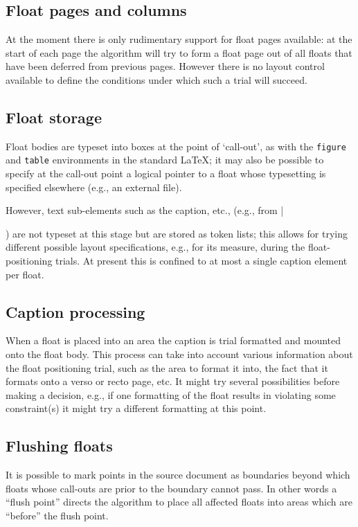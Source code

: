 \documentclass[twocolumn]{article}
\begin{document}
\subsection{Float pages and columns}

At the moment there is only rudimentary support for float pages
available: at the start of each page the algorithm will try to form a
float page out of all floats that have been deferred from previous
pages. However there is no layout control available to define the
conditions under which such a trial will succeed.


\subsection{Float storage}

Float bodies are typeset into boxes at the point of `call-out', as
with the \texttt{figure} and \texttt{table} environments in the standard
\LaTeX; it may also be possible to specify at the call-out point a
logical pointer to a float whose typesetting is specified elsewhere
(e.g., an external file).

However, text sub-elements such as the caption, etc., (e.g., from
|\caption|) are not typeset at this stage but are stored as token
lists; this allows for trying different possible layout specifications,
e.g., for its measure, during the float-positioning trials.  At present
this is confined to at most a single caption element per float.

\subsection{Caption processing}

When a float is placed into an area the caption is trial formatted and
mounted onto the float body. This process can take into account
various information about the float positioning trial, such as the
area to format it into, the fact that it formats onto a verso or recto
page, etc. It might try several possibilities before making a decision,
e.g., if one formatting of the float results in violating some
constraint(s) it might try a different formatting at this point.



\subsection{Flushing floats}

It is possible to mark points in the source document as boundaries beyond
which floats whose call-outs are prior to the boundary cannot pass. In
other words a ``flush point'' directs the algorithm to place all
affected floats into areas which are ``before'' the flush point.
\end{document}
